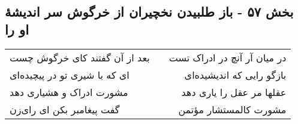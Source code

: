 \begin{center}
\section*{بخش ۵۷ - باز طلبیدن نخچیران از خرگوش سر اندیشهٔ او را}
\label{sec:sh057}
\begin{longtable}{l p{0.5cm} r}
بعد از آن گفتند کای خرگوش چست
&&
در میان آر آنچ در ادراک تست
\\
ای که با شیری تو در پیچیده‌ای
&&
بازگو رایی که اندیشیده‌ای
\\
مشورت ادراک و هشیاری دهد
&&
عقلها مر عقل را یاری دهد
\\
گفت پیغامبر بکن ای رای‌زن
&&
مشورت کالمستشار مؤتمن
\\
\end{longtable}
\end{center}
